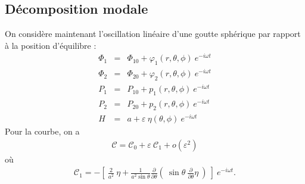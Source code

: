 \documentclass[a4paper]{report}
\begin{document}
\subsection{Décomposition modale}
On considère maintenant l'oscillation linéaire d'une goutte sphérique par rapport à la position d'équilibre :
\begin{eqnarray*}
\varPhi_1   &=& \varPhi_{10} + \varphi_1(r,\theta,\phi)\ e^{- i \omega t} \\
\varPhi_2   &=& \varPhi_{20} + \varphi_2(r,\theta,\phi)\ e^{- i \omega t} \\
P_1         &=& P_{10} + p_1(r,\theta,\phi)\ e^{- i \omega t}\\
P_2         &=& P_{20} + p_2(r,\theta,\phi)\ e^{- i \omega t}\\
H           &=& a + \varepsilon\ \eta(\theta,\phi)\ e^{- i \omega t}
\end{eqnarray*}
Pour la courbe, on a
\begin{eqnarray*}
\mathscr{C} = \mathscr{C}_0 + \varepsilon \ \mathscr{C}_1 + o(\varepsilon^2)
\end{eqnarray*}
où
\begin{eqnarray*}
\mathscr{C}_1 = - \left[\ \frac{2}{a^2} \ \eta
                          + \frac{1}{a^2 \sin\theta} \frac{\partial}{\partial \theta}(\ \sin\theta \ \frac{\partial}{\partial \theta} \eta \ )\ \right]\ e^{- i \omega t}.
\end{eqnarray*}
\end{document}
